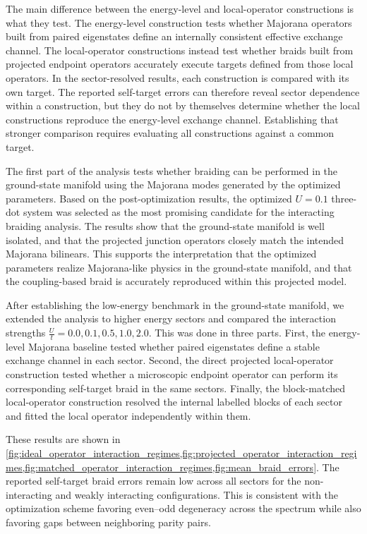 The main difference between the energy-level and local-operator constructions is what they test. The energy-level construction tests whether Majorana operators built from paired eigenstates define an internally consistent effective exchange channel. The local-operator constructions instead test whether braids built from projected endpoint operators accurately execute targets defined from those local operators. In the sector-resolved results, each construction is compared with its own target. The reported self-target errors can therefore reveal sector dependence within a construction, but they do not by themselves determine whether the local constructions reproduce the energy-level exchange channel. Establishing that stronger comparison requires evaluating all constructions against a common target.

The first part of the analysis tests whether braiding can be performed in the ground-state manifold using the Majorana modes generated by the optimized parameters. Based on the post-optimization results, the optimized $U=0.1$ three-dot system was selected as the most promising candidate for the interacting braiding analysis. The results show that the ground-state manifold is well isolated, and that the projected junction operators closely match the intended Majorana bilinears. This supports the interpretation that the optimized parameters realize Majorana-like physics in the ground-state manifold, and that the coupling-based braid is accurately reproduced within this projected model.

After establishing the low-energy benchmark in the ground-state manifold, we extended the analysis to higher energy sectors and compared the interaction strengths $\frac{U}{t}=0.0,0.1,0.5,1.0,2.0$. This was done in three parts. First, the energy-level Majorana baseline tested whether paired eigenstates define a stable exchange channel in each sector. Second, the direct projected local-operator construction tested whether a microscopic endpoint operator can perform its corresponding self-target braid in the same sectors. Finally, the block-matched local-operator construction resolved the internal labelled blocks of each sector and fitted the local operator independently within them.

These results are shown in \cref{fig:ideal_operator_interaction_regimes,fig:projected_operator_interaction_regimes,fig:matched_operator_interaction_regimes,fig:mean_braid_errors}. The reported self-target braid errors remain low across all sectors for the non-interacting and weakly interacting configurations. This is consistent with the optimization scheme favoring even--odd degeneracy across the spectrum while also favoring gaps between neighboring parity pairs.

